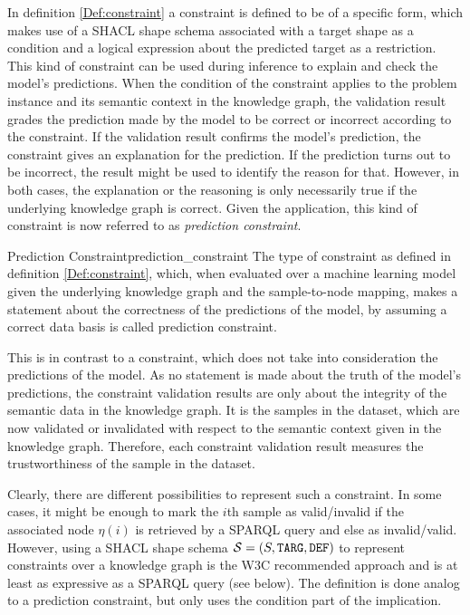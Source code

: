 In definition \ref{Def:constraint} a constraint is defined to be of a specific form, which makes use of a SHACL shape schema associated with a target shape as a condition and a logical expression about the predicted target as a restriction. This kind of constraint can be used during inference to explain and check the model's predictions. When the condition of the constraint applies to the problem instance and its semantic context in the knowledge graph, the validation result grades the prediction made by the model to be correct or incorrect according to the constraint. If the validation result confirms the model's prediction, the constraint gives an explanation for the prediction. If the prediction turns out to be incorrect, the result might be used to identify the reason for that. However, in both cases, the explanation or the reasoning is only necessarily true if the underlying knowledge graph is correct. Given the application, this kind of constraint is now referred to as \emph{prediction constraint}. 

\begin{Def}{Prediction Constraint}{prediction_constraint}
The type of constraint as defined in definition \ref{Def:constraint}, which, when evaluated over a machine learning model given the underlying knowledge graph and the sample-to-node mapping, makes a statement about the correctness of the predictions of the model, by assuming a correct data basis is called prediction constraint. 
\end{Def}

This is in contrast to a constraint, which does not take into consideration the predictions of the model. As no statement is made about the truth of the model's predictions, the constraint validation results are only about the integrity of the semantic data in the knowledge graph. It is the samples in the dataset, which are now validated or invalidated with respect to the semantic context given in the knowledge graph. Therefore, each constraint validation result measures the trustworthiness of the sample in the dataset.

Clearly, there are different possibilities to represent such a constraint. In some cases, it might be enough to mark the $i$th sample as valid/invalid if the associated node $\eta(i)$ is retrieved by a SPARQL query and else as invalid/valid. However, using a SHACL shape schema $\mathcal{S} = (S,\texttt{TARG}, \texttt{DEF})$ to represent constraints over a knowledge graph is the W3C recommended approach and is at least as expressive as a SPARQL query (see below). The definition is done analog to a prediction constraint, but only uses the condition part of the implication.

